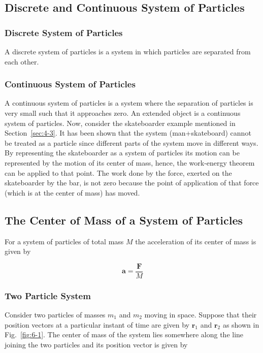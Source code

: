 \documentclass[10pt]{article}
\numberwithin{equation}{section}
\begin{document}
\subsection{Discrete and Continuous System of Particles}\label{sec:6-2}
\subsubsection{Discrete System of Particles}\label{sec:6-2-1}
A discrete system of particles is a system in which particles are separated from each other.

\subsubsection{Continuous System of Particles}\label{sec:6-2-2}
A continuous system of particles is a system where the separation of particles is very small such that it approaches zero. An extended object is a continuous system of particles. Now, consider the skateboarder example mentioned in Section~\ref{sec:4-3}. It has been shown that the system (man+skateboard) cannot be treated as a particle since different parts of the system move in different ways. By representing the skateboarder as a system of particles its motion can be represented by the motion of its center of mass, hence, the work-energy theorem can be applied to that point. The work done by the force, exerted on the skateboarder by the bar, is not zero because the point of application of that force (which is at the center of mass) has moved.

\subsection{The Center of Mass of a System of Particles}\label{sec:6-3}
For a system of particles of total mass $M$ the acceleration of its center of mass is given by

$$
\mathbf{a}=\frac{\mathbf{F}}{M}
$$

\subsubsection{Two Particle System}\label{sec:6-3-1}
Consider two particles of masses $m_{1}$ and $m_{2}$ moving in space. Suppose that their position vectors at a particular instant of time are given by $\mathbf{r}_{1}$ and $\mathbf{r}_{2}$ as shown in Fig.~\ref{fig:6-1}. The center of mass of the system lies somewhere along the line joining the two particles and its position vector is given by
\end{document}
